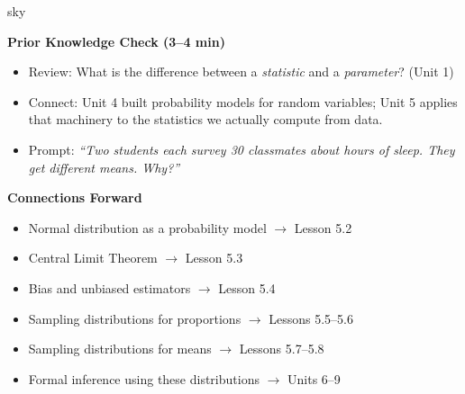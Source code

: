 \documentclass[10pt]{article}
\begin{document}
\begin{skillbox}{sky}
\begin{minipage}[t]{0.48\linewidth}
    \textbf{Prior Knowledge Check (3--4 min)}
    \begin{itemize}
        \item Review: What is the difference between a \emph{statistic} and a
              \emph{parameter}? (Unit 1)
        \item Connect: Unit 4 built probability models for random variables; Unit 5
              applies that machinery to the statistics we actually compute from data.
        \item Prompt: \textit{``Two students each survey 30 classmates about hours
              of sleep. They get different means. Why?''}
    \end{itemize}
\end{minipage}
\hfill
\begin{minipage}[t]{0.48\linewidth}
    \textbf{Connections Forward}
    \begin{itemize}
        \item Normal distribution as a probability model $\to$ Lesson 5.2
        \item Central Limit Theorem $\to$ Lesson 5.3
        \item Bias and unbiased estimators $\to$ Lesson 5.4
        \item Sampling distributions for proportions $\to$ Lessons 5.5--5.6
        \item Sampling distributions for means $\to$ Lessons 5.7--5.8
        \item Formal inference using these distributions $\to$ Units 6--9
    \end{itemize}
\end{minipage}
\end{skillbox}
\end{document}
